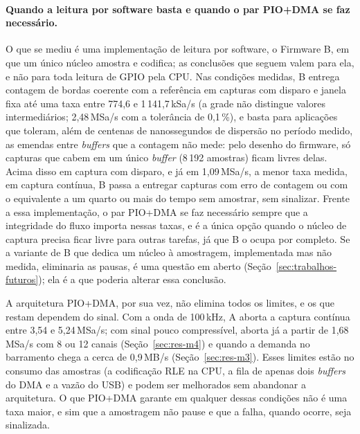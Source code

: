 \paragraph{Quando a leitura por software basta e quando o par PIO+DMA se faz necessário.}
O que se mediu é uma implementação de leitura por software, o Firmware B, em
que um único núcleo amostra e codifica; as conclusões que seguem valem para
ela, e não para toda leitura de \ac{GPIO} pela \ac{CPU}. Nas condições
medidas, B entrega contagem de bordas coerente com a referência em capturas
com disparo e janela fixa até uma taxa entre 774,6 e 1\,141,7\,kSa/s (a
grade não distingue valores intermediários; 2,48\,MSa/s com a tolerância de
0,1\,\%), e basta para aplicações que toleram, além de centenas de
nanossegundos de dispersão no período medido, as emendas entre \emph{buffers}
que a contagem não mede: pelo desenho do firmware, só capturas que cabem em um
único \emph{buffer} (8\,192 amostras) ficam livres delas. Acima disso em
captura com disparo, e já em 1,09\,MSa/s, a menor taxa medida, em captura
contínua, B passa a entregar capturas com erro de contagem ou com o equivalente
a um quarto ou mais do tempo sem amostrar, sem sinalizar. Frente a essa
implementação, o par \ac{PIO}+\ac{DMA} se faz necessário sempre que a
integridade do fluxo importa nessas taxas, e é a única opção quando o núcleo
de captura precisa ficar livre para outras tarefas, já que B o ocupa por
completo. Se a variante de B que dedica um núcleo à amostragem, implementada
mas não medida, eliminaria as pausas, é uma questão em aberto
(Seção~\ref{sec:trabalhos-futuros}); ela é a que poderia alterar essa
conclusão.

A arquitetura \ac{PIO}+\ac{DMA}, por sua vez, não elimina todos os limites,
e os que restam dependem do sinal. Com a onda de 100\,kHz, A aborta a captura
contínua entre 3,54 e 5,24\,MSa/s; com sinal pouco compressível, aborta já a
partir de 1,68\,MSa/s com 8 ou 12 canais (Seção~\ref{sec:res-m4}) e quando a
demanda no barramento chega a cerca de 0,9\,MB/s (Seção~\ref{sec:res-m3}).
Esses limites estão no consumo das amostras (a codificação \ac{RLE} na
\ac{CPU}, a fila de apenas dois \emph{buffers} do \ac{DMA} e a vazão do
\ac{USB}) e podem ser melhorados sem abandonar a arquitetura. O que
\ac{PIO}+\ac{DMA} garante em qualquer dessas condições não é uma taxa maior,
e sim que a amostragem não pause e que a falha, quando ocorre, seja
sinalizada.

